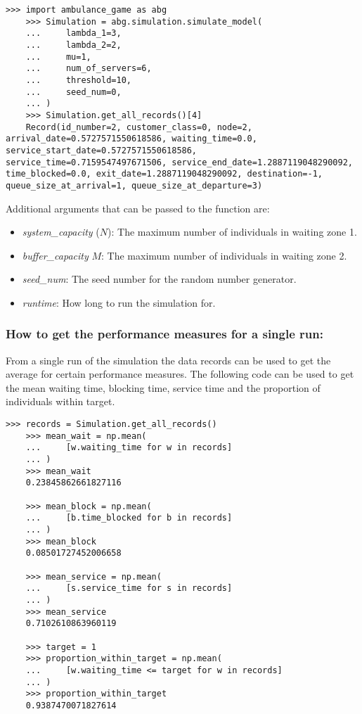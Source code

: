 \begin{lstlisting}[style=pystyle]
    >>> import ambulance_game as abg
    >>> Simulation = abg.simulation.simulate_model(
    ...     lambda_1=3,
    ...     lambda_2=2,
    ...     mu=1,
    ...     num_of_servers=6,
    ...     threshold=10,
    ...     seed_num=0,
    ... )
    >>> Simulation.get_all_records()[4]
    Record(id_number=2, customer_class=0, node=2, arrival_date=0.5727571550618586, waiting_time=0.0, service_start_date=0.5727571550618586, service_time=0.7159547497671506, service_end_date=1.2887119048290092, time_blocked=0.0, exit_date=1.2887119048290092, destination=-1, queue_size_at_arrival=1, queue_size_at_departure=3)

\end{lstlisting}

Additional arguments that can be passed to the function are:
\begin{itemize}
    \item \textit{system\_capacity} (\(N\)): The maximum number of individuals 
    in waiting zone 1.
    \item \textit{buffer\_capacity} \(M\): The maximum number of individuals in 
    waiting zone 2.
    \item \textit{seed\_num}: The seed number for the random number generator.
    \item \textit{runtime}: How long to run the simulation for.
\end{itemize}

\subsubsection{How to get the performance measures for a single run:}
From a single run of the simulation the data records can be used to get the
average for certain performance measures. 
The following code can be used to get the mean waiting time, blocking time, 
service time and the proportion of individuals within target.

\begin{lstlisting}[style=pystyle]
    >>> records = Simulation.get_all_records()
    >>> mean_wait = np.mean(
    ...     [w.waiting_time for w in records]
    ... )
    >>> mean_wait
    0.23845862661827116

    >>> mean_block = np.mean(
    ...     [b.time_blocked for b in records]
    ... )
    >>> mean_block
    0.08501727452006658

    >>> mean_service = np.mean(
    ...     [s.service_time for s in records]
    ... )
    >>> mean_service
    0.7102610863960119

    >>> target = 1
    >>> proportion_within_target = np.mean(
    ...     [w.waiting_time <= target for w in records]
    ... )
    >>> proportion_within_target
    0.9387470071827614
    
\end{lstlisting}


